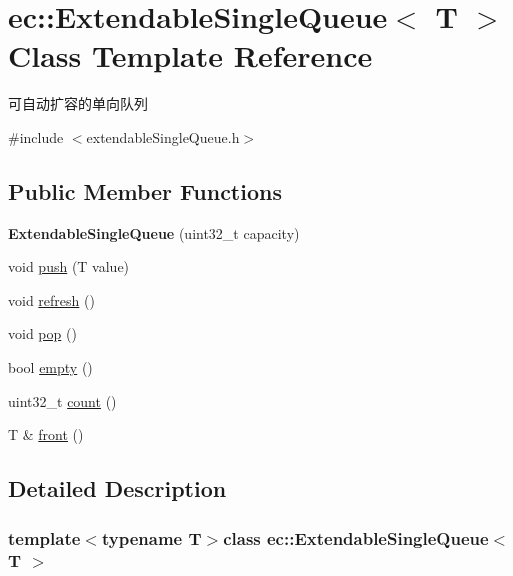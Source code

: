 \hypertarget{classec_1_1ExtendableSingleQueue}{\section{ec\-:\-:Extendable\-Single\-Queue$<$ T $>$ Class Template Reference}
\label{classec_1_1ExtendableSingleQueue}
}


可自动扩容的单向队列  




{\ttfamily \#include $<$extendable\-Single\-Queue.\-h$>$}

\subsection*{Public Member Functions}
\begin{DoxyCompactItemize}
\item 
\hypertarget{classec_1_1ExtendableSingleQueue_a9764f38bb0919dda8c93903d8e832604}{{\bfseries Extendable\-Single\-Queue} (uint32\-\_\-t capacity)}\label{classec_1_1ExtendableSingleQueue_a9764f38bb0919dda8c93903d8e832604}

\item 
void \hyperlink{classec_1_1ExtendableSingleQueue_af3c78472828763c77124617296fa4bd3}{push} (T value)
\item 
void \hyperlink{classec_1_1ExtendableSingleQueue_a85bf9411c1e2c10b3a6c5ebdecbc1aea}{refresh} ()
\item 
void \hyperlink{classec_1_1ExtendableSingleQueue_a822dad426a52a071f91d33b28ed2a716}{pop} ()
\item 
bool \hyperlink{classec_1_1ExtendableSingleQueue_a1dc01081add861f3f170b69039bf8f00}{empty} ()
\item 
uint32\-\_\-t \hyperlink{classec_1_1ExtendableSingleQueue_a1261070907529db84c74d8db004a9639}{count} ()
\item 
T \& \hyperlink{classec_1_1ExtendableSingleQueue_a82a41ffedde6119696c55f1a1560a023}{front} ()
\end{DoxyCompactItemize}


\subsection{Detailed Description}
\subsubsection*{template$<$typename T$>$class ec\-::\-Extendable\-Single\-Queue$<$ T $>$}

